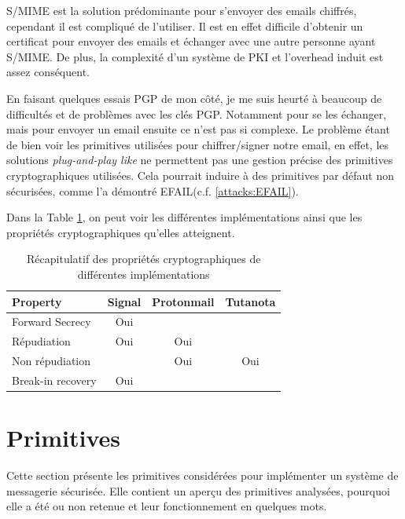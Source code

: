 S/MIME est la solution prédominante pour s'envoyer des emails chiffrés, cependant il est compliqué de l'utiliser. Il est en effet difficile d'obtenir un certificat pour envoyer des emails et échanger avec une autre personne ayant S/MIME. De plus, la complexité d'un système de PKI et l'overhead induit est assez conséquent.

En faisant quelques essais PGP de mon côté, je me suis heurté à beaucoup de difficultés et de problèmes avec les clés PGP. Notamment pour se les échanger, mais pour envoyer un email ensuite ce n'est pas si complexe. Le problème étant de bien voir les primitives utilisées pour chiffrer/signer notre email, en effet, les solutions \textit{plug-and-play like} ne permettent pas une gestion précise des primitives cryptographiques utilisées. Cela pourrait induire à des primitives par défaut non sécurisées, comme l'a démontré EFAIL(c.f. \ref{attacks:EFAIL}).

Dans la Table \ref{tab:recapProps}, on peut voir les différentes implémentations ainsi que les propriétés cryptographiques qu'elles atteignent.
\begin{table}[]
	\centering
	\begin{tabular}{|lccc|}
		\hline
		Property          & Signal & Protonmail & Tutanota \\ \hline
		Forward Secrecy   & Oui    &            &          \\
		Répudiation       & Oui    & Oui        &          \\
		Non répudiation   &        & Oui        & Oui      \\
		Break-in recovery & Oui    &            &          \\ \hline
	\end{tabular}
	\caption{Récapitulatif des propriétés cryptographiques de différentes implémentations}
	\label{tab:recapProps}
\end{table}
\section{Primitives}
Cette section présente les primitives considérées pour implémenter un système de messagerie sécurisée. Elle contient un aperçu des primitives analysées, pourquoi elle a été ou non retenue et leur fonctionnement en quelques mots.
